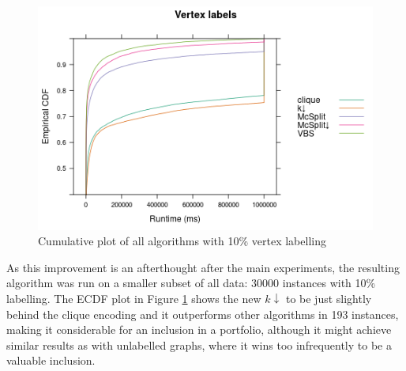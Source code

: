 \documentclass{l4proj}
\theoremstyle{definition}
\theoremstyle{remark}
\begin{document}
\begin{figure}
  \centering
  \includegraphics[scale=0.5]{images/ecdf_kdown.png}
  \caption{Cumulative plot of all algorithms with 10\% vertex labelling}
  \label{fig:ecdf_kdown}
\end{figure}

As this improvement is an afterthought after the main experiments, the resulting
algorithm was run on a smaller subset of all data: \num{30000} instances with
10\% labelling. The ECDF plot in Figure \ref{fig:ecdf_kdown} shows the new
$k\downarrow$ to be just slightly behind the clique encoding and it outperforms
other algorithms in 193 instances, making it considerable for an inclusion in
a portfolio, although it might achieve similar results as with unlabelled
graphs, where it wins too infrequently to be a valuable inclusion.




\end{document}
